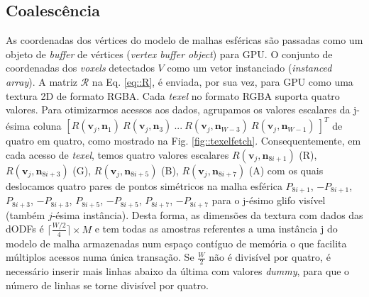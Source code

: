 \subsection{Coalescência}
\label{ssec::coalescencia}


As coordenadas dos vértices do modelo de malhas esféricas são passadas como um objeto de \textit{buffer} de vértices (\textit{vertex buffer object}) para GPU. O conjunto de coordenadas dos \textit{voxels} detectados $V$ como um vetor instanciado (\textit{instanced array}). A matriz $\boldsymbol{\mathscr{R}}$ na Eq. \ref{eq::R}, é enviada, por sua vez, para GPU como uma textura 2D de formato RGBA. Cada \textit{texel} no formato RGBA suporta quatro valores. Para otimizarmos acessos aos dados, agrupamos os valores escalares da j-ésima coluna $[
R(\mathbf{v}_{j}, \mathbf{n}_1) ~
R(\mathbf{v}_{j}, \mathbf{n}_3) ~ ... ~
R(\mathbf{v}_{j}, \mathbf{n}_{W-3}) ~
R(\mathbf{v}_{j}, \mathbf{n}_{W-1}) ~
]^T$ de quatro em quatro, como mostrado na Fig. \ref{fig::texelfetch}. Consequentemente, em cada acesso de \textit{texel}, temos quatro valores escalares $
R(\mathbf{v}_{j}, \mathbf{\mathbf{n}}_{8i+1})$ (R), $
R(\mathbf{v}_{j}, \mathbf{\mathbf{n}}_{8i+3})$ (G), $
R(\mathbf{v}_{j}, \mathbf{\mathbf{n}}_{8i+5})$ (B), $
R(\mathbf{v}_{j}, \mathbf{\mathbf{n}}_{8i+7})$ (A) com os quais deslocamos quatro pares de pontos simétricos na malha esférica $P_{8i+1}$, $-P_{8i+1}$, $P_{8i+3}$, $-P_{8i+3}$, $P_{8i+5}$, $-P_{8i+5}$, $P_{8i+7}$, $-P_{8i+7}$ para o j-ésimo glifo visível (também $j$-ésima instância). Desta forma, as dimensões da textura com dados das dODFs é $ \lceil \frac{W/2}{4} \rceil \times M$ e tem todas as amostras referentes a uma instância j do modelo de malha armazenadas num espaço contíguo de memória o que facilita múltiplos acessos numa única transação. Se $\frac{W}{2}$ não é divisível por quatro, é necessário inserir mais linhas abaixo da última com valores \textit{dummy}, para que o número de linhas se torne divisível por quatro.

